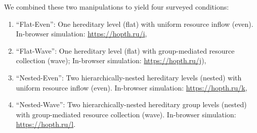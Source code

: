 We combined these two manipulations to yield four surveyed conditions:
\begin{enumerate}
\item ``Flat-Even'': One hereditary level (flat) with uniform resource inflow (even). In-browser simulation: \url{https://hopth.ru/i},
\item ``Flat-Wave'': One hereditary level (flat) with group-mediated resource collection (wave); In-browser simulation: \url{https://hopth.ru/j}),
\item ``Nested-Even'': Two hierarchically-nested hereditary levels (nested) with uniform resource inflow (even). In-browser simulation: \url{https://hopth.ru/k},
\item ``Nested-Wave'': Two hierarchically-nested hereditary group levels (nested) with group-mediated resource collection (wave). In-browser simulation: \url{https://hopth.ru/l}.
\end{enumerate}
